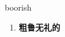 
\begin{frame}
{\huge boorish}
\begin{center}
\begin{enumerate}\Large
  \item \textbf{粗鲁无礼的}
\end{enumerate}
\end{center}
\end{frame}

